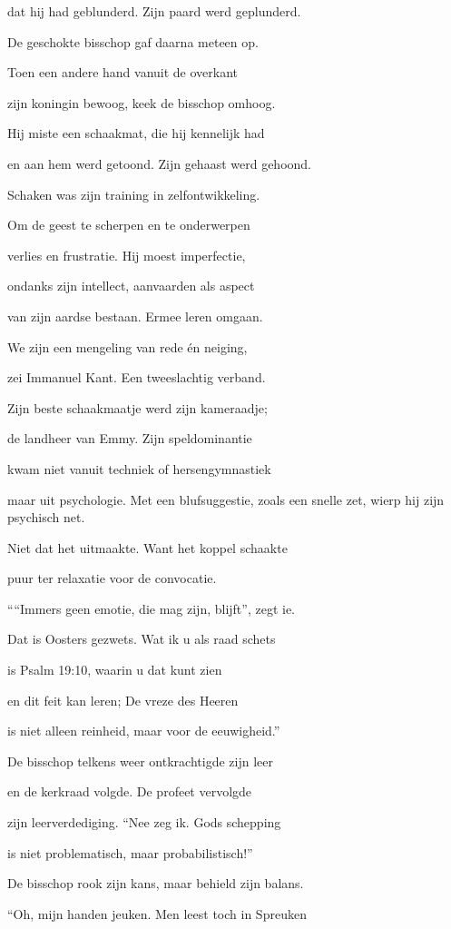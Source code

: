 dat hij had geblunderd.
Zijn paard werd geplunderd.

De geschokte bisschop
gaf daarna meteen op.

Toen een andere hand
vanuit de overkant

zijn koningin bewoog,
keek de bisschop omhoog.

Hij miste een schaakmat,
die hij kennelijk had

en aan hem werd getoond.
Zijn gehaast werd gehoond.

Schaken was zijn training
in zelfontwikkeling.

Om de geest te scherpen
en te onderwerpen

verlies en frustratie.
Hij moest imperfectie,

ondanks zijn intellect,
aanvaarden als aspect

van zijn aardse bestaan.
Ermee leren omgaan.

We zijn een mengeling
van rede én neiging,

zei Immanuel Kant.
Een tweeslachtig verband.

Zijn beste schaakmaatje
werd zijn kameraadje;

de landheer van Emmy.
Zijn speldominantie

kwam niet vanuit techniek
of hersengymnastiek

maar uit psychologie.
Met een blufsuggestie,
zoals een snelle zet,
wierp hij zijn psychisch net.

Niet dat het uitmaakte.
Want het koppel schaakte

puur ter relaxatie
voor de convocatie.

““Immers geen emotie,
die mag zijn, blijft”, zegt ie.

Dat is Oosters gezwets.
Wat ik u als raad schets

is Psalm 19:10,
waarin u dat kunt zien

en dit feit kan leren;
De vreze des Heeren

is niet alleen reinheid,
maar voor de eeuwigheid.”

De bisschop telkens weer
ontkrachtigde zijn leer

en de kerkraad volgde.
De profeet vervolgde

zijn leerverdediging.
“Nee zeg ik. Gods schepping

is niet problematisch,
maar probabilistisch!”

De bisschop rook zijn kans,
maar behield zijn balans.

“Oh, mijn handen jeuken.
Men leest toch in Spreuken


